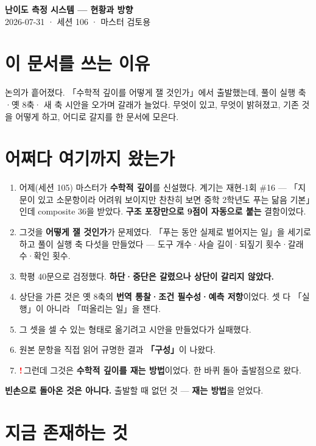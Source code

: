 \documentclass[11pt]{article}
\newcommand{\R}{\textcolor{red}{\textbf{!}}\,}
\begin{document}
\begin{center}
{\LARGE\bfseries\color{navy} 난이도 측정 시스템 — 현황과 방향}\\[4pt]
{\color{gray} 2026-07-31 · 세션 106 · 마스터 검토용}
\end{center}
\vspace{4mm}

\section{이 문서를 쓰는 이유}

논의가 흩어졌다. 「수학적 깊이를 어떻게 잴 것인가」에서 출발했는데, 풀이 실행 축·옛 8축·
새 축 시안을 오가며 갈래가 늘었다. 무엇이 있고, 무엇이 밝혀졌고, 기존 것을 어떻게 하고,
어디로 갈지를 한 문서에 모은다.

\section{어쩌다 여기까지 왔는가}

\begin{enumerate}[label=\arabic*.]
\item 어제(세션 105) 마스터가 \textbf{수학적 깊이}를 신설했다. 계기는 재현-1회 \#16 —
「지문이 있고 소문항이라 어려워 보이지만 찬찬히 보면 중학 2학년도 푸는 닮음 기본」인데
composite 36을 받았다. \textbf{구조 포장만으로 9점이 자동으로 붙는} 결함이었다.
\item 그것을 \textbf{어떻게 잴 것인가}가 문제였다. 「푸는 동안 실제로 벌어지는 일」을 세기로 하고
풀이 실행 축 다섯을 만들었다 — 도구 개수·사슬 길이·되짚기 횟수·갈래 수·확인 횟수.
\item 학평 40문으로 검정했다. \textbf{하단·중단은 갈렸으나 상단이 갈리지 않았다.}
\item 상단을 가른 것은 옛 8축의 \textbf{번역 통찰·조건 필수성·예측 저항}이었다. 셋 다 「실행」이 아니라
「떠올리는 일」을 잰다.
\item 그 셋을 셀 수 있는 형태로 옮기려고 시안을 만들었다가 실패했다.
\item 원본 문항을 직접 읽어 규명한 결과 \textbf{「구성」}이 나왔다.
\item \R 그런데 그것은 \textbf{수학적 깊이를 재는 방법}이었다. 한 바퀴 돌아 출발점으로 왔다.
\end{enumerate}

\textbf{빈손으로 돌아온 것은 아니다.} 출발할 때 없던 것 — \textbf{재는 방법}을 얻었다.

\section{지금 존재하는 것}
\end{document}
